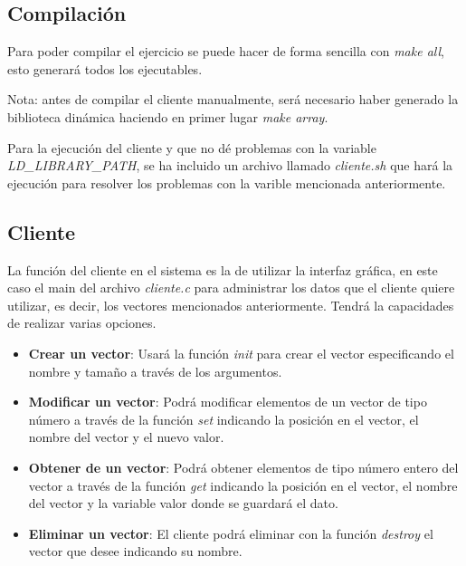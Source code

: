 \documentclass[10pt, spanish, pdftex]{template/UC3M_document}
\begin{document}
\subsection{Compilación}
Para poder compilar el ejercicio se puede hacer de forma sencilla con \textit{make all}, esto generará todos los ejecutables.

Nota: antes de compilar el cliente manualmente, será necesario haber generado la biblioteca dinámica haciendo en primer lugar \textit{make array}.

Para la ejecución del cliente y que no dé problemas con la variable \textit{LD\_LIBRARY\_PATH}, se ha incluido un archivo llamado \textit{cliente.sh} que hará la ejecución para resolver los problemas con la varible mencionada anteriormente.
\subsection{Cliente}
La función del cliente en el sistema es la de utilizar la interfaz gráfica, en este caso el main del archivo \textit{cliente.c} para administrar los datos que el cliente quiere utilizar, es decir, los vectores mencionados anteriormente. Tendrá la capacidades de realizar varias opciones.

\begin{itemize}
  \item \textbf{Crear un vector}: Usará la función \textit{init} para crear el vector especificando el nombre y tamaño a través de los argumentos.
  \item \textbf{Modificar un vector}: Podrá modificar elementos de un vector de tipo número a través de la función \textit{set} indicando la posición en el vector, el nombre del vector y el nuevo valor.
  \item \textbf{Obtener de un vector}: Podrá obtener elementos de tipo número entero del vector a través de la función \textit{get} indicando la posición en el vector, el nombre del vector y la variable valor donde se guardará el dato.
  \item \textbf{Eliminar un vector}: El cliente podrá eliminar con la función \textit{destroy} el vector que desee indicando su nombre.
\end{itemize}
\end{document}
